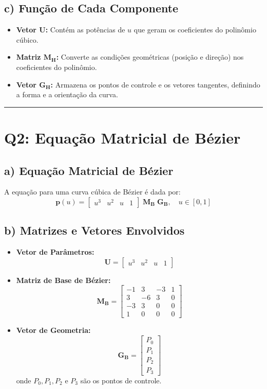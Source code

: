 \documentclass[a4paper,12pt]{article}
\begin{document}
\subsection*{c) Função de Cada Componente}
\begin{itemize}
    \item \textbf{Vetor \(\mathbf{U}\):} Contém as potências de \( u \) que geram os coeficientes do polinômio cúbico.
    \item \textbf{Matriz \(\mathbf{M_H}\):} Converte as condições geométricas (posição e direção) nos coeficientes do polinômio.
    \item \textbf{Vetor \(\mathbf{G_H}\):} Armazena os pontos de controle e os vetores tangentes, definindo a forma e a orientação da curva.
\end{itemize}

\hrule
\vspace{0.5cm}

\section*{Q2: Equação Matricial de Bézier}

\subsection*{a) Equação Matricial de Bézier}
A equação para uma curva cúbica de Bézier é dada por:
\[
\mathbf{p}(u) = \begin{bmatrix} u^3 & u^2 & u & 1 \end{bmatrix} \; \mathbf{M_B} \; \mathbf{G_B}, \quad u \in [0,1]
\]

\subsection*{b) Matrizes e Vetores Envolvidos}
\begin{itemize}
    \item \textbf{Vetor de Parâmetros:} 
    \[
    \mathbf{U} = \begin{bmatrix} u^3 & u^2 & u & 1 \end{bmatrix}
    \]
    \item \textbf{Matriz de Base de Bézier:}
    \[
    \mathbf{M_B} = 
    \begin{bmatrix}
    -1 & 3 & -3 & 1 \\
    3 & -6 & 3 & 0 \\
    -3 & 3 & 0 & 0 \\
    1 & 0 & 0 & 0
    \end{bmatrix}
    \]
    \item \textbf{Vetor de Geometria:}
    \[
    \mathbf{G_B} =
    \begin{bmatrix}
    P_0 \\
    P_1 \\
    P_2 \\
    P_3
    \end{bmatrix}
    \]
    onde \( P_0, P_1, P_2 \) e \( P_3 \) são os pontos de controle.
\end{itemize}
\end{document}
